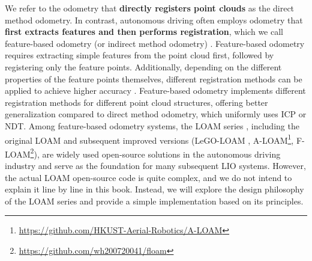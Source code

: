 We refer to the odometry that \textbf{directly registers point clouds} as the direct method odometry. In contrast, autonomous driving often employs odometry that \textbf{first extracts features and then performs registration}, which we call feature-based odometry (or indirect method odometry) \cite{Wei2020}. Feature-based odometry requires extracting simple features from the point cloud first, followed by registering only the feature points. Additionally, depending on the different properties of the feature points themselves, different registration methods can be applied to achieve higher accuracy \cite{Hata2015}. Feature-based odometry implements different registration methods for different point cloud structures, offering better generalization compared to direct method odometry, which uniformly uses ICP or NDT. Among feature-based odometry systems, the LOAM series \cite{Zhang2014}, including the original LOAM \cite{Zhang2014} and subsequent improved versions (LeGO-LOAM \cite{Shan2018}, A-LOAM\footnote{\url{https://github.com/HKUST-Aerial-Robotics/A-LOAM}}, F-LOAM\footnote{\url{https://github.com/wh200720041/floam}}), are widely used open-source solutions in the autonomous driving industry and serve as the foundation for many subsequent LIO systems. However, the actual LOAM open-source code is quite complex, and we do not intend to explain it line by line in this book. Instead, we will explore the design philosophy of the LOAM series and provide a simple implementation based on its principles.  


